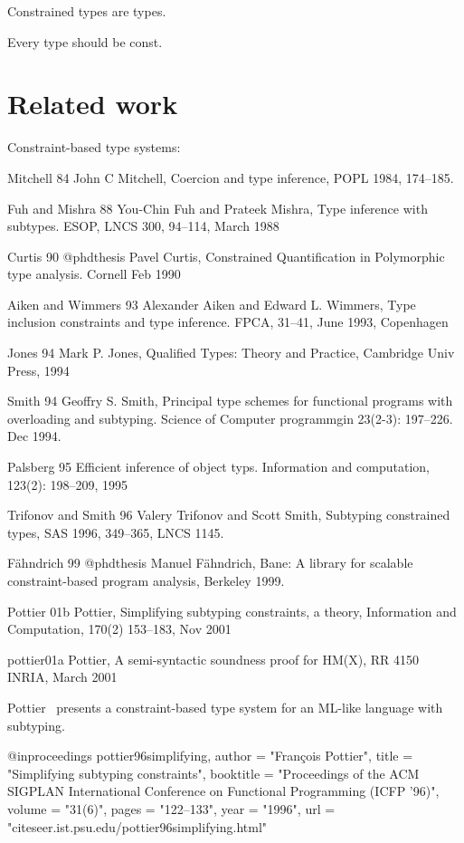 \documentclass[nocopyrightspace,preprint,10pt]{sigplanconf}
\begin{document}
Constrained types are types.

Every type should be const.

\section{Related work}

Constraint-based type systems:

Mitchell 84
John C Mitchell, Coercion and type inference, POPL 1984, 174--185.

Fuh and Mishra 88
You-Chin Fuh and Prateek Mishra, Type inference with subtypes.
ESOP, LNCS 300, 94--114, March 1988

Curtis 90
@phdthesis Pavel Curtis, Constrained Quantification in Polymorphic type
analysis.  Cornell Feb 1990

Aiken and Wimmers 93
Alexander Aiken and Edward L. Wimmers, Type inclusion constraints and type
inference.  FPCA, 31--41, June 1993, Copenhagen

Jones 94
Mark P. Jones, Qualified Types: Theory and Practice, Cambridge Univ Press, 1994

Smith 94
Geoffry S. Smith, Principal type schemes for functional programs with
overloading and subtyping.  Science of Computer programmgin 23(2-3): 197--226.
Dec 1994. 

Palsberg 95
Efficient inference of object typs.  Information and computation,
123(2): 198--209, 1995

Trifonov and Smith 96
Valery Trifonov and Scott Smith, Subtyping constrained types, SAS 1996,
349--365, LNCS 1145.

F\"ahndrich 99
@phdthesis Manuel F\"ahndrich, Bane: A library for scalable constraint-based
program analysis, Berkeley 1999.

Pottier 01b
Pottier, Simplifying subtyping constraints, a theory, Information and Computation, 170(2) 153--183, Nov 2001

pottier01a
Pottier, A semi-syntactic soundness proof for HM(X), RR 4150 INRIA, March 2001


Pottier~\cite{pottier96simplifying}
presents a constraint-based type system for an ML-like language with 
subtyping.

@inproceedings{ pottier96simplifying,
    author = "Fran\c{c}ois Pottier",
    title = "Simplifying subtyping constraints",
    booktitle = "Proceedings of the {ACM} {SIGPLAN} International Conference on Functional Programming ({ICFP} '96)",
    volume = "31(6)",
    pages = "122--133",
    year = "1996",
    url = "citeseer.ist.psu.edu/pottier96simplifying.html" }
\end{document}
